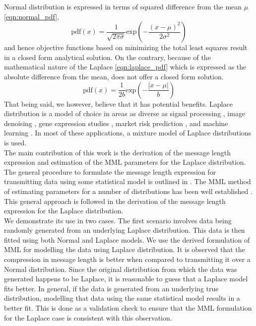 \documentclass[wcp]{jmlr}
\begin{document}
Normal distribution is expressed in terms of squared difference from the mean $\mu$
\eqref{eqn:normal_pdf},
\begin{equation}
\mathrm{pdf}(x) = \frac{1}{\sqrt{2\pi\sigma}} \mathrm{exp}\left(-\frac{(x-\mu)^2}{2\sigma^2}\right) \label{eqn:normal_pdf}
\end{equation}
and hence objective functions based on minimizing the total least squares result in a 
closed form analytical solution. On the contrary, because of the mathematical
nature of the Laplace \eqref{eqn:laplace_pdf} which is expressed as the absolute 
difference from the mean, does not offer a closed form solution.
\begin{equation}
\mathrm{pdf}(x) = \frac{1}{2b}\mathrm{exp}\left(-\frac{|x-\mu|}{b}\right) \label{eqn:laplace_pdf}
\end{equation}
That being said, we however, believe that it has potential benefits. Laplace distribution
is a model of choice in areas as diverse as signal processing 
\citep{laplace-signal-processing}, image denoising \citep{image-denoising},
gene expression studies \citep{Bhowmick01102006}, market risk prediction
\citep{haas2005modeling}, and machine learning \citep{Cord:2006:FSR:1167556.1167570}.
In most of these applications, a mixture model of Laplace distributions is used. \\

The main contribution of this work is the derivation of the message length 
expression and estimation of the MML parameters for the Laplace distribution.
The general procedure to formulate the message length expression for transmitting
data using some statistical model is outlined in \citet{wallace-87}. The MML method
of estimating parameters for a number of distributions has been well established
\citep{WallaceBook}. This general approach is followed in the derivation of the
message length expression for the Laplace distribution. \\

We demonstrate its use in two cases. The first scenario involves data being randomly
generated from an underlying Laplace distribution. This data is then fitted using
both Normal and Laplace models. We use the derived formulation of MML for modelling
the data using Laplace distribution. It is observed that the compression in message
length is better when compared to transmitting it over a Normal distribution. Since
the original distribution from which the data was generated happens to be Laplace,
it is reasonable to guess that a Laplace model fits better. In general, if the
data is generated from an underlying true distribution, modelling that data using
the same statistical model results in a better fit.
This is done as a validation check to ensure that the MML formulation for the 
Laplace case is consistent with this observation. \\
\end{document}
